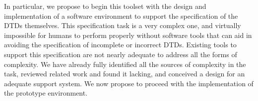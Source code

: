 In particular, we propose to begin this toolset with the design and
implementation of a software environment to support the specification
of the DTDs themselves.  This specification task is a very complex one,
and virtually impossible for humans to perform properly without software
tools that can aid in avoiding the specification of incomplete or
incorrect DTDs.  Existing tools to support this specification are not
nearly adequate to address all the forms of complexity.  We have
already fully identified all the sources of complexity in the task,
reviewed related work and found it lacking, and conceived a design for
an adequate support system.  We now propose to proceed with the
implementation of the prototype environment.



